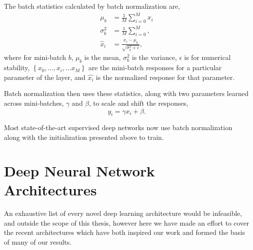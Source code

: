 \documentclass[thesis]{subfiles}
\begin{document}

The batch statistics calculated by batch normalization are,
\begin{equation}
\begin{aligned}
    \mu_b &= \frac{1}{M} \sum^M_{i=0} x_i\\
    \sigma^2_b &= \frac{1}{M} \sum^M_{i=0},\\
    \hat{x}_i &= \frac{x_i - \mu_b}{\sqrt{\sigma^2_b + \epsilon}},
\end{aligned}
\end{equation}
where for mini-batch $b$, $\mu_b$ is the mean, $\sigma^2_b$ is the variance, $\epsilon$ is for numerical stability, $\left\{x_0, \ldots, x_i, \ldots x_M\right\}$ are the mini-batch responses for a particular parameter of the layer, and $\hat{x_i}$ is the normalized response for that parameter. 

Batch normalization then uses these statistics, along with two parameters learned across mini-batches, $\gamma$ and $\beta$, to scale and shift the responses,
\begin{equation}    
    y_i = \gamma \hat{x_i} + \beta.
\end{equation}

Most state-of-the-art supervised deep networks now use batch normalization along with the initialization presented above to train.
\section{Deep Neural Network Architectures}
An exhaustive list of every novel deep learning architecture would be infeasible, and outside the scope of this thesis, however here we have made an effort to cover the recent architectures which have both inspired our work and formed the basis of many of our results.
\end{document}
